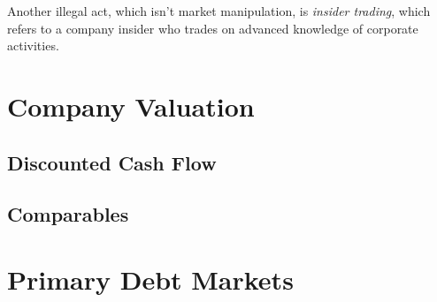 \documentclass{article}
\begin{document}
    Another illegal act, which isn't market manipulation, is \textit{insider trading}, which refers to a company insider who trades on advanced knowledge of corporate activities. 

\section{Company Valuation}

  \subsection{Discounted Cash Flow}

  \subsection{Comparables}

\section{Primary Debt Markets}
\end{document}
